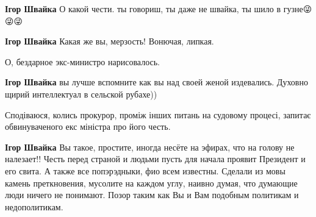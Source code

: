 \begin{itemize}
\begin{itemize}
\textbf{Ігор Швайка} О какой чести. ты говориш, ты даже не швайка, ты шило в гузне😜😜😜

 
\textbf{Ігор Швайка} Какая же вы, мерзость! Вонючая, липкая.

 
О, бездарное экс-министро нарисовалось.

 
\textbf{Ігор Швайка} вы лучше вспомните как вы над своей женой издевались. Духовно щирий интеллектуал в сельской рубахе))

 
Сподіваюся, колись прокурор, проміж інших питань на судовому процесі, запитає обвинуваченого екс міністра про його честь.

 
\textbf{Ігор Швайка} Вы такое, простите, иногда несёте на эфирах, что на голову
не налезает!! Честь перед страной и людьми пусть для начала проявит Президент и
его свита. А также все попэрэдныки, фио всем известны. Сделали из мовы камень
преткновения, мусолите на каждом углу, наивно думая, что думающие люди ничего
не понимают. Позор таким как Вы и Вам подобным политикам и недополитикам.


 

\end{itemize}
\end{itemize}
